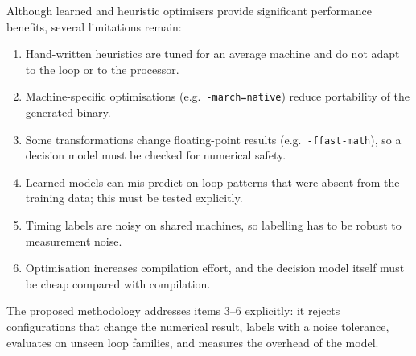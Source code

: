Although learned and heuristic optimisers provide significant performance
benefits, several limitations remain:

\begin{enumerate}
    \item Hand-written heuristics are tuned for an average machine and do not
    adapt to the loop or to the processor.
    \item Machine-specific optimisations (e.g.\ \texttt{-march=native}) reduce
    portability of the generated binary.
    \item Some transformations change floating-point results
    (e.g.\ \texttt{-ffast-math}), so a decision model must be checked for
    numerical safety.
    \item Learned models can mis-predict on loop patterns that were absent from
    the training data; this must be tested explicitly.
    \item Timing labels are noisy on shared machines, so labelling has to be
    robust to measurement noise.
    \item Optimisation increases compilation effort, and the decision model
    itself must be cheap compared with compilation.
\end{enumerate}

The proposed methodology addresses items 3--6 explicitly: it rejects
configurations that change the numerical result, labels with a noise
tolerance, evaluates on unseen loop families, and measures the overhead of
the model.

\newpage
